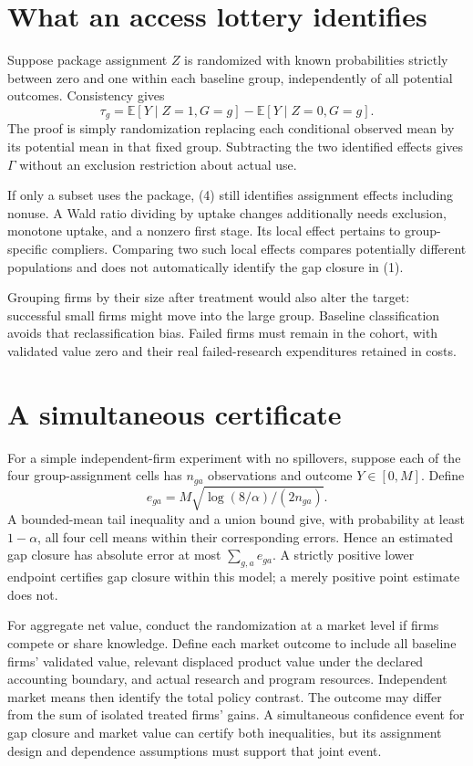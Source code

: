\documentclass[11pt,a4paper]{article}
\newcommand{\E}{\mathbb E}
\begin{document}
\section{What an access lottery identifies}
Suppose package assignment $Z$ is randomized with known probabilities strictly between zero and one within each baseline group, independently of all potential outcomes. Consistency gives
\[
 \tau_g=\E[Y\mid Z=1,G=g]-\E[Y\mid Z=0,G=g].
 \tag{4}
\]
The proof is simply randomization replacing each conditional observed mean by its potential mean in that fixed group. Subtracting the two identified effects gives $\Gamma$ without an exclusion restriction about actual use.

If only a subset uses the package, (4) still identifies assignment effects including nonuse. A Wald ratio dividing by uptake changes additionally needs exclusion, monotone uptake, and a nonzero first stage. Its local effect pertains to group-specific compliers. Comparing two such local effects compares potentially different populations and does not automatically identify the gap closure in (1).

Grouping firms by their size after treatment would also alter the target: successful small firms might move into the large group. Baseline classification avoids that reclassification bias. Failed firms must remain in the cohort, with validated value zero and their real failed-research expenditures retained in costs.
\section{A simultaneous certificate}
For a simple independent-firm experiment with no spillovers, suppose each of the four group-assignment cells has $n_{ga}$ observations and outcome $Y\in[0,M]$. Define
\[
 e_{ga}=M\sqrt{\log(8/\alpha)/(2n_{ga})}.
\]
A bounded-mean tail inequality and a union bound give, with probability at least $1-\alpha$, all four cell means within their corresponding errors. Hence an estimated gap closure has absolute error at most $\sum_{g,a}e_{ga}$. A strictly positive lower endpoint certifies gap closure within this model; a merely positive point estimate does not.

For aggregate net value, conduct the randomization at a market level if firms compete or share knowledge. Define each market outcome to include all baseline firms' validated value, relevant displaced product value under the declared accounting boundary, and actual research and program resources. Independent market means then identify the total policy contrast. The outcome may differ from the sum of isolated treated firms' gains. A simultaneous confidence event for gap closure and market value can certify both inequalities, but its assignment design and dependence assumptions must support that joint event.
\end{document}

